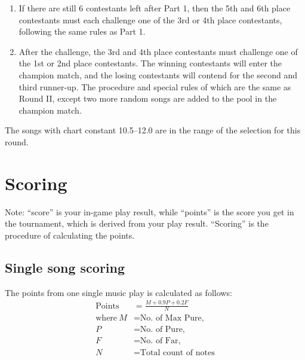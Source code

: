 \documentclass{article}
\newcommand{\alert}[1]{{\color{red} #1}}
\begin{document}
\begin{enumerate}

	\item If there are still 6 contestants left after Part 1,
	      then the 5th and 6th place contestants must each challenge
	      one of the 3rd or 4th place contestants,
	      following the same rules as Part 1.

	\item After the challenge, the 3rd and 4th place contestants
	      must challenge one of the 1st or 2nd place contestants.
	      The winning contestants will enter the champion match,
	      and the losing contestants will contend for the
	      second and third runner-up.
	      The procedure and special rules of which
	      are the same as Round II,
	      except two more random songs are added
	      to the pool in the champion match.

\end{enumerate}

\alert{
	The songs with chart constant 10.5--12.0
	are in the range of the selection for this round.
}

\section{Scoring}  %

Note: ``score'' is your in-game play result,
while ``points'' is the score you get in the tournament,
which is derived from your play result.
``Scoring'' is the procedure of calculating the points.

\newcommand{\Points}{\text{Points}}

\subsection{Single song scoring}
The points from one single music play is calculated as follows:
\alert{
	\begin{align*}
		\Points        & = \frac{M + 0.9P + 0.2F}{N}   \\
		\text{where}~M & = \text{No.~of Max Pure,}     \\
		P              & = \text{No.~of Pure,}         \\
		F              & = \text{No.~of Far,}          \\
		N              & = \text{Total count of notes}
	\end{align*}
}
\end{document}
